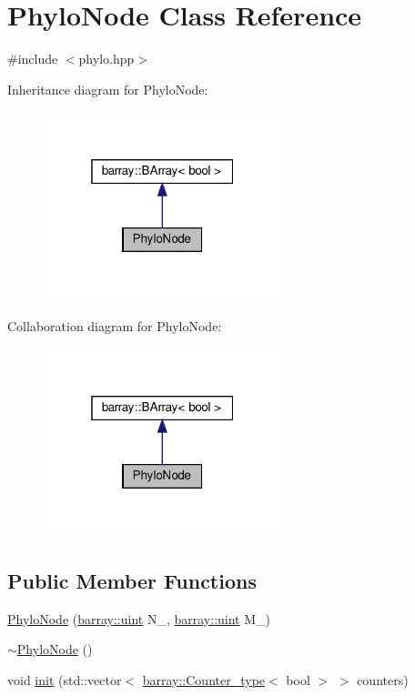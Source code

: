 \hypertarget{class_phylo_node}{}\section{Phylo\+Node Class Reference}
\label{class_phylo_node}


{\ttfamily \#include $<$phylo.\+hpp$>$}



Inheritance diagram for Phylo\+Node\+:
\nopagebreak
\begin{figure}[H]
\begin{center}
\leavevmode
\includegraphics[width=196pt]{class_phylo_node__inherit__graph}
\end{center}
\end{figure}


Collaboration diagram for Phylo\+Node\+:
\nopagebreak
\begin{figure}[H]
\begin{center}
\leavevmode
\includegraphics[width=196pt]{class_phylo_node__coll__graph}
\end{center}
\end{figure}
\subsection*{Public Member Functions}
\begin{DoxyCompactItemize}
\item 
\hyperlink{class_phylo_node_ae1a65ae64da5cd5b9ba154d5246f5409}{Phylo\+Node} (\hyperlink{namespacebarray_af9756a31953db233f80a9cfe1ef31c32}{barray\+::uint} N\+\_\+, \hyperlink{namespacebarray_af9756a31953db233f80a9cfe1ef31c32}{barray\+::uint} M\+\_\+)
\item 
\hyperlink{class_phylo_node_ac1753eafd402a1c709bed60c2a3d04bb}{$\sim$\+Phylo\+Node} ()
\item 
void \hyperlink{class_phylo_node_a4f0a519f46010f53fb776cc7f8b992c1}{init} (std\+::vector$<$ \hyperlink{namespacebarray_a4e53ad306ef79910e07db94c29ec4f0e}{barray\+::\+Counter\+\_\+type}$<$ bool $>$ $>$ counters)
\end{DoxyCompactItemize}


